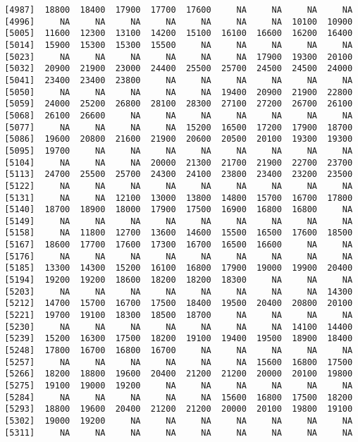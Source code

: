 \documentclass[]{article}
\begin{document}
\begin{verbatim}
 [4987]  18800  18400  17900  17700  17600     NA     NA     NA     NA
 [4996]     NA     NA     NA     NA     NA     NA     NA  10100  10900
 [5005]  11600  12300  13100  14200  15100  16100  16600  16200  16400
 [5014]  15900  15300  15300  15500     NA     NA     NA     NA     NA
 [5023]     NA     NA     NA     NA     NA     NA  17900  19300  20100
 [5032]  20900  21900  23000  24400  25500  25700  24500  24500  24000
 [5041]  23400  23400  23800     NA     NA     NA     NA     NA     NA
 [5050]     NA     NA     NA     NA     NA  19400  20900  21900  22800
 [5059]  24000  25200  26800  28100  28300  27100  27200  26700  26100
 [5068]  26100  26600     NA     NA     NA     NA     NA     NA     NA
 [5077]     NA     NA     NA     NA  15200  16500  17200  17900  18700
 [5086]  19600  20800  21600  21900  20600  20500  20100  19300  19300
 [5095]  19700     NA     NA     NA     NA     NA     NA     NA     NA
 [5104]     NA     NA     NA  20000  21300  21700  21900  22700  23700
 [5113]  24700  25500  25700  24300  24100  23800  23400  23200  23500
 [5122]     NA     NA     NA     NA     NA     NA     NA     NA     NA
 [5131]     NA     NA  12100  13000  13800  14800  15700  16700  17800
 [5140]  18700  18900  18000  17900  17500  16900  16800  16800     NA
 [5149]     NA     NA     NA     NA     NA     NA     NA     NA     NA
 [5158]     NA  11800  12700  13600  14600  15500  16500  17600  18500
 [5167]  18600  17700  17600  17300  16700  16500  16600     NA     NA
 [5176]     NA     NA     NA     NA     NA     NA     NA     NA     NA
 [5185]  13300  14300  15200  16100  16800  17900  19000  19900  20400
 [5194]  19200  19200  18600  18200  18200  18300     NA     NA     NA
 [5203]     NA     NA     NA     NA     NA     NA     NA     NA  14300
 [5212]  14700  15700  16700  17500  18400  19500  20400  20800  20100
 [5221]  19700  19100  18300  18500  18700     NA     NA     NA     NA
 [5230]     NA     NA     NA     NA     NA     NA     NA  14100  14400
 [5239]  15200  16300  17500  18200  19100  19400  19500  18900  18400
 [5248]  17800  16700  16800  16700     NA     NA     NA     NA     NA
 [5257]     NA     NA     NA     NA     NA     NA  15600  16800  17500
 [5266]  18200  18800  19600  20400  21200  21200  20000  20100  19800
 [5275]  19100  19000  19200     NA     NA     NA     NA     NA     NA
 [5284]     NA     NA     NA     NA     NA  15600  16800  17500  18200
 [5293]  18800  19600  20400  21200  21200  20000  20100  19800  19100
 [5302]  19000  19200     NA     NA     NA     NA     NA     NA     NA
 [5311]     NA     NA     NA     NA     NA     NA     NA     NA     NA

\end{verbatim}
\end{document}
